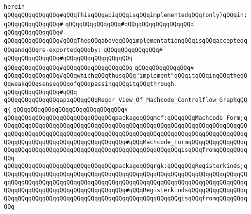 \verb|herein|\newline
\newline
\verb|qQQqqQQqqQQqqQQq#qQQqThisqQQqapiqQQqisqQQqimplementedqQQq(only)qQQqin:|\newline
\verb|qQQqqQQqqQQqqQQq#|\newline
\verb|qQQqqQQqqQQqqQQq#qQQqqQQqqQQqqQQqqQQq|\newline
\verb|qQQqqQQqqQQqqQQq#|\newline
\verb|qQQqqQQqqQQqqQQq#qQQqTheqQQqaboveqQQqimplementationqQQqisqQQqacceptedqQQqandqQQqre-exportedqQQqby:|\newline
\verb|qQQqqQQqqQQqqQQq#|\newline
\verb|qQQqqQQqqQQqqQQq#qQQqqQQqqQQqqQQqqQQq|\newline
\verb|qQQqqQQqqQQqqQQq#qQQqqQQqqQQqqQQqqQQq|\newline
\verb|qQQqqQQqqQQqqQQq#|\newline
\verb|qQQqqQQqqQQqqQQq#qQQqwhichqQQqthusqQQq"implement"qQQqitqQQqinqQQqtheqQQqweakqQQqsenseqQQqofqQQqpassingqQQqitqQQqthrough.|\newline
\verb|qQQqqQQqqQQqqQQq#qQQq|\newline
\verb|qQQqqQQqqQQqqQQqapiqQQqqQQqRegor_View_Of_Machcode_Controlflow_GraphqQQq{|\newline
\verb|qQQqqQQqqQQqqQQqqQQqqQQqqQQqqQQq#|\newline
\verb|qQQqqQQqqQQqqQQqqQQqqQQqqQQqqQQqpackageqQQqmcf:qQQqqQQqMachcode_Form;qQQqqQQqqQQqqQQqqQQqqQQqqQQqqQQqqQQqqQQqqQQqqQQqqQQqqQQqqQQqqQQqqQQqqQQqqQQqqQQqqQQqqQQqqQQqqQQqqQQqqQQqqQQqqQQqqQQqqQQqqQQqqQQqqQQqqQQqqQQqqQQqqQQqqQQqqQQqqQQqqQQqqQQqqQQqqQQq#qQQqMachcode_FormqQQqqQQqqQQqqQQqqQQqqQQqqQQqqQQqqQQqqQQqqQQqqQQqqQQqqQQqqQQqqQQqqQQqisqQQqfromqQQqqQQqqQQq|\newline
\verb|qQQqqQQqqQQqqQQqqQQqqQQqqQQqqQQqpackageqQQqrgk:qQQqqQQqRegisterkinds;qQQqqQQqqQQqqQQqqQQqqQQqqQQqqQQqqQQqqQQqqQQqqQQqqQQqqQQqqQQqqQQqqQQqqQQqqQQqqQQqqQQqqQQqqQQqqQQqqQQqqQQqqQQqqQQqqQQqqQQqqQQqqQQqqQQqqQQqqQQqqQQqqQQqqQQqqQQqqQQqqQQqqQQqqQQqqQQq#qQQqRegisterkindsqQQqqQQqqQQqqQQqqQQqqQQqqQQqqQQqqQQqqQQqqQQqqQQqqQQqqQQqqQQqqQQqqQQqisqQQqfromqQQqqQQqqQQq|\newline

